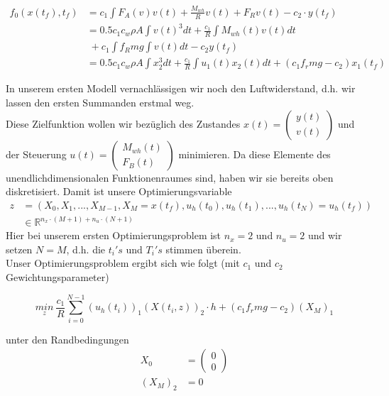 \documentclass[12pt,a4paper]{article}
\theoremstyle{definition}
\theoremstyle{plain}
\begin{document}
	\begin{align*}
	f_0(x(t_f), t_f) & =  c_{1} \int F_A(v) v(t)  + \frac{M_{wh}}{R} v(t) + F_Rv(t) - c_{2}\cdot y(t_{f})\\
	&= 0.5c_1 c_w \rho A \int v(t)^3 dt + \frac{c_1}{R} \int M_{wh}(t)v(t) dt \\
	&\; + c_1 \int f_R m g \int v(t) dt -c_2 y(t_f)\\
	&= 0.5c_1 c_w \rho A \int x_2^3 dt + \frac{c_1}{R} \int u_1(t)x_2(t) dt + (c_1 f_r m g -c_2) x_1(t_f)
	\end{align*}
	
	In unserem ersten Modell vernachlässigen wir noch den Luftwiderstand, d.h. wir lassen den ersten Summanden erstmal weg.\\
	
	Diese Zielfunktion wollen wir bezüglich des Zustandes $x(t)=\begin{pmatrix} y(t) \\ v(t) \end{pmatrix}$ und der Steuerung $u(t)=\begin{pmatrix} M_{wh}(t) \\ F_B(t) \end{pmatrix}$ minimieren. Da diese Elemente des unendlichdimensionalen Funktionenraumes sind, haben wir sie bereits oben diskretisiert.
	Damit ist unsere Optimierungsvariable \begin{align*}
	z&=(X_{0},X_{1},...,X_{M-1},X_{M}=x(t_{f}), u_{h}(t_{0}), u_{h}(t_{1}), ..., u_{h}(t_{N})=u_{h}(t_{f}))\\
	&\in \mathbb{R}^{n_{x}\cdot (M+1)+n_{u}\cdot (N+1)}
	\end{align*}
	Hier bei unserem ersten Optimierungsproblem ist $n_{x}=2$ und $n_{u}=2$ und wir setzen $N=M$, d.h. die $t_{i}'s$ und $T_{i}'s$ stimmen überein.\\
	
	Unser Optimierungsproblem ergibt sich wie folgt (mit $c_{1}$ und $c_{2}$ Gewichtungsparameter) %
	
	\begin{equation}
	\underset{z}{min}\ \frac{c_1}{R} \sum_{i=0}^{N-1} (u_{h}(t_{i}))_{1}(X(t_{i},z))_{2}\cdot h + (c_1 f_r m g -c_2) (X_{M})_{1}
	\end{equation}
	
	unter den Randbedingungen
	\begin{align}
	X_{0} &= \begin{pmatrix}
	0 \\ 0
	\end{pmatrix}\\
	(X_{M})_{2} &= 0
	\end{align}
	
\end{document}
